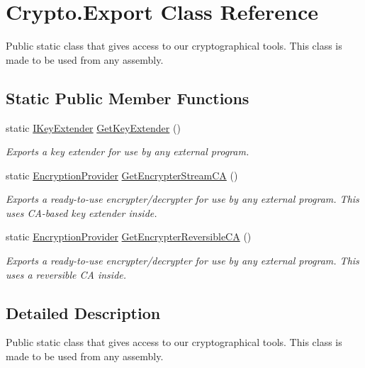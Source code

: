 \hypertarget{class_crypto_1_1_export}{}\section{Crypto.\+Export Class Reference}
\label{class_crypto_1_1_export}


Public static class that gives access to our cryptographical tools. This class is made to be used from any assembly.  


\subsection*{Static Public Member Functions}
\begin{DoxyCompactItemize}
\item 
static \hyperlink{interface_crypto_1_1_i_key_extender}{I\+Key\+Extender} \hyperlink{class_crypto_1_1_export_a32a0f5d57f02adbe05c8b9c6ca2d30fe}{Get\+Key\+Extender} ()
\begin{DoxyCompactList}\small\item\em Exports a key extender for use by any external program. \end{DoxyCompactList}\item 
static \hyperlink{class_crypto_1_1_encryption_provider}{Encryption\+Provider} \hyperlink{class_crypto_1_1_export_afc9bd2e88da642244b5b63b88b8d8534}{Get\+Encrypter\+Stream\+C\+A} ()
\begin{DoxyCompactList}\small\item\em Exports a ready-\/to-\/use encrypter/decrypter for use by any external program. This uses C\+A-\/based key extender inside. \end{DoxyCompactList}\item 
static \hyperlink{class_crypto_1_1_encryption_provider}{Encryption\+Provider} \hyperlink{class_crypto_1_1_export_a15aa10acf40823cfe3aab1e0b8f4b729}{Get\+Encrypter\+Reversible\+C\+A} ()
\begin{DoxyCompactList}\small\item\em Exports a ready-\/to-\/use encrypter/decrypter for use by any external program. This uses a reversible C\+A inside. \end{DoxyCompactList}\end{DoxyCompactItemize}


\subsection{Detailed Description}
Public static class that gives access to our cryptographical tools. This class is made to be used from any assembly. 



